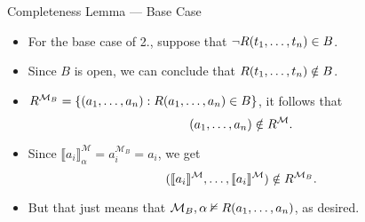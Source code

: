 \documentclass[../slides.tex]{subfiles}
\begin{document}
\begin{frame}{Completeness Lemma --- Base Case}

  \begin{itemize}

  \item  For the base case of 2., suppose that
                            $\neg R(t_1, \mathellipsis, t_n)\in
                            B$.

                            \item Since $B$ is open, we can conclude
                            that $R(t_1,\mathellipsis, t_n)\notin
                            B$.

                            \item $R^{\mathcal{M}_B}=\{(a_1,
                              \mathellipsis, a_n): R(a_1,
                              \mathellipsis, a_n)\in B\}$, it follows
                              that \[(a_1, \mathellipsis, a_n)\notin
                              R^\mathcal{M}.\]

                              \item Since $\llbracket
                                a_i\rrbracket^\mathcal{M}_\alpha=a_i^{\mathcal{M}_B}=a_i$,
                                we get \[(\llbracket
                                a_i\rrbracket^\mathcal{M},
                                \mathellipsis, \llbracket
                                a_i\rrbracket^\mathcal{M})\notin
                                R^{\mathcal{M}_B}.\]

                                \item But that just means that
                                  $\mathcal{M}_B,\alpha\nvDash R(a_1,
                                  \mathellipsis, a_n)$, as desired.
   
  \end{itemize}


  
\end{frame}
\end{document}
